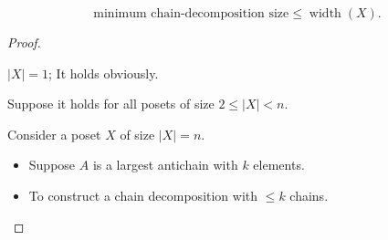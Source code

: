 \begin{frame}{}
  \begin{lemma}
    \[
      \text{minimum chain-decomposition size} \le \operatorname{width}(X).
    \]
  \end{lemma}

  \pause
  {\small
  \begin{proof}
    \begin{center}
    \end{center}

    \pause
    \begin{description}
      \setlength{\itemsep}{8pt}
      \item[Base Case:] $|X| = 1$; It holds obviously.
      \pause
      \item[Inductive Hypothesis:]
        Suppose it holds for all posets
        of size $2 \le |X| < n$.
      \pause
      \item[Inductive Step:]
        Consider a poset $X$ of size $|X| = n$.
        \vspace{0.20cm}
        \begin{itemize}
          \setlength{\itemsep}{6pt}
          \pause
          \item Suppose $A$ is a largest antichain with $k$ elements.
          \pause
          \item To construct a chain decomposition with $\le k$ chains.
        \end{itemize}
    \end{description}
  \end{proof}}
\end{frame}

